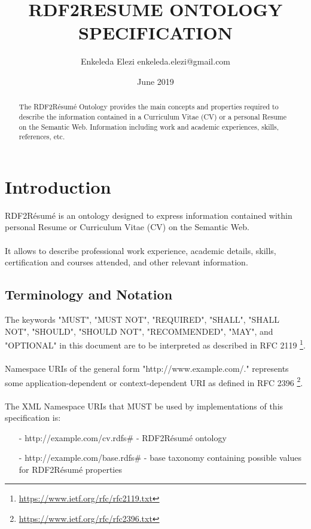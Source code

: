 \documentclass[a4paper,12pt]{article}
\title{RDF2RESUME ONTOLOGY SPECIFICATION}
\author{Enkeleda Elezi enkeleda.elezi@gmail.com}
\date{June 2019}
\numberwithin{equation}{section}
\begin{document}
\maketitle

\begin{abstract}
 The RDF2R{\'e}sum{\'e} Ontology provides the main concepts and properties required to describe the information contained in a Curriculum Vitae (CV) or a personal Resume on the Semantic Web. Information including work and academic experiences, skills, references, etc.
\end{abstract}

\tableofcontents\newpage{}

\section{Introduction}\label{introduction}
RDF2R{\'e}sum{\'e} is an ontology designed to express information contained within personal Resume or Curriculum Vitae (CV) on the Semantic Web.
\\\\
It allows to describe professional work experience, academic details, skills, certification and courses attended, and other relevant information.

\subsection{Terminology and Notation}
The keywords "MUST", "MUST NOT", "REQUIRED", "SHALL", "SHALL NOT", "SHOULD", "SHOULD NOT", "RECOMMENDED", "MAY", and "OPTIONAL" in this document are to be interpreted as described in RFC 2119 \footnote{\url{https://www.ietf.org/rfc/rfc2119.txt}}.
\\\\
Namespace URIs of the general form "http://www.example.com/." represents some application-dependent or context-dependent URI as defined in RFC 2396 \footnote{\url{https://www.ietf.org/rfc/rfc2396.txt}}.
\\\\
The XML Namespace URIs that MUST be used by implementations of this specification is:

\begin{itemize}
\item[-] http://example.com/cv.rdfs\# - RDF2R{\'e}sum{\'e} ontology
\item[-] http://example.com/base.rdfs\# - base taxonomy containing possible values for RDF2R{\'e}sum{\'e} properties
\end{itemize}
\end{document}
